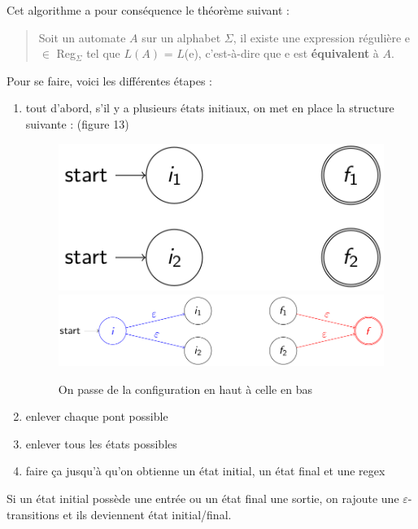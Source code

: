 \documentclass{article}
\begin{document}
Cet algorithme a pour conséquence le théorème suivant :
\begin{quote}
    Soit un automate $A$ sur un alphabet $\Sigma$, il existe une expression régulière e $\in$ Reg$_{\Sigma}$ tel que $L(A)$ = $L$(e), c'est-à-dire que e est \textbf{équivalent} à $A$.
\end{quote}

Pour se faire, voici les différentes étapes :
\begin{enumerate}
    \item tout d'abord, s'il y a plusieurs états initiaux, on met en place la structure suivante : (figure 13)
        \begin{figure}[h]
            \centering
            \includegraphics[scale=0.4]{without_clusk.png}
            \includegraphics[scale=0.4]{with_clusk.png}
            \caption{On passe de la configuration en haut à celle en bas}
        \end{figure}
    \item enlever chaque pont possible
    \item enlever tous les états possibles
    \item faire ça jusqu'à qu'on obtienne un état initial, un état final et une regex
\end{enumerate}
Si un état initial possède une entrée ou un état final une sortie, on rajoute une $\varepsilon$-transitions et ils deviennent état initial/final.

\newpage
\end{document}
